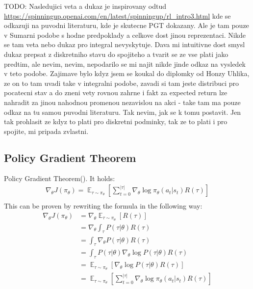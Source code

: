 \par
{
\color{blue}
TODO: Nasledujici veta a dukaz je inspirovany odtud \url{https://spinningup.openai.com/en/latest/spinningup/rl_intro3.html} kde se odkazuji na puvodni literaturu, kde je skutecne PGT dokazany. Ale je tam pouze v Sumarni podobe s hodne predpoklady a celkove dost jinou reprezentaci.
Nikde se tam veta nebo dukaz pro integral nevyskytuje. Dava mi intuitivne dost smysl dukaz prepsat z diskretniho stavu do spojiteho a tvarit se ze vse plati jako predtim, ale nevim, nevim, nepodarilo se mi najit nikde jinde odkaz na vysledek v teto podobe.
Zajimave bylo kdyz jsem se koukal do diplomky od Honzy Uhlika, ze on to tam uvadi take v integralni podobe, zavadi si tam jeste distribuci pro pocatecni stav a do zneni vety rovnou zahrne i fakt za expected return lze nahradit za jinou nahodnou promenou nezavislou na akci - take tam ma pouze odkaz na tu samou puvodni literaturu.
Tak nevim, jak se k tomu postavit. Jen tak prohlasit ze kdyz to plati pro diskretni podminky, tak ze to plati i pro spojite, mi pripada zvlastni.
}
\subsection{Policy Gradient Theorem}
Policy Gradient Theorem(\cite{sutton2018reinforcement}). It holds: 
\begin{align*}
  \nabla_\theta J(\pi_\theta) = \mathop{\mathbb{E}}_{\tau \sim \pi_\theta}[\sum_{t=0}^{|\tau|} \nabla_\theta \log \pi_\theta(a_t|s_t) R(\tau)] \\
\end{align*}
This can be proven by rewriting the formula in the following way:
\begin{align*}
  \nabla_\theta J(\pi_\theta) &= \nabla_\theta \mathop{\mathbb{E}}_{\tau \sim \pi_\theta}[R(\tau)] \\
  &= \nabla_\theta \int_{\tau}^{}P(\tau|\theta)R(\tau) \\
  &= \int_{\tau}^{} \nabla_\theta P(\tau|\theta)R(\tau) \\
  &= \int_{\tau}^{} P(\tau|\theta)\nabla_\theta \log P(\tau|\theta)R(\tau) \\
  &= \mathop{\mathbb{E}}_{\tau \sim \pi_\theta}[\nabla_\theta \log P(\tau|\theta)R(\tau)] \\
  &= \mathop{\mathbb{E}}_{\tau \sim \pi_\theta}[\sum_{t=0}^{|\tau|}  \nabla_\theta \log \pi_\theta(a_t|s_t) R(\tau)] \\
\end{align*}

